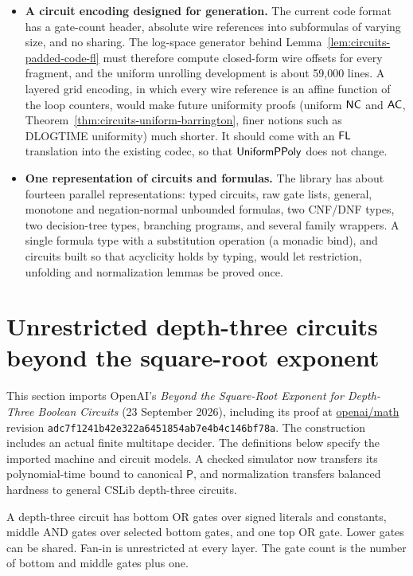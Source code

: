 \begin{itemize}
  \item \textbf{A circuit encoding designed for generation.} The current code
    format has a gate-count header, absolute wire references into subformulas
    of varying size, and no sharing. The log-space generator behind
    Lemma~\ref{lem:circuits-padded-code-fl} must therefore compute closed-form
    wire offsets for every fragment, and the uniform unrolling development is
    about 59,000 lines. A layered grid encoding, in which every wire reference
    is an affine function of the loop counters, would make future uniformity
    proofs (uniform $\mathsf{NC}$ and $\mathsf{AC}$, Theorem~\ref{thm:circuits-uniform-barrington},
    finer notions such as DLOGTIME uniformity) much shorter. It should come
    with an $\mathsf{FL}$ translation into the existing codec, so that
    $\mathsf{UniformPPoly}$ does not change.
  \item \textbf{One representation of circuits and formulas.} The library has
    about fourteen parallel representations: typed circuits, raw gate lists,
    general, monotone and negation-normal unbounded formulas, two CNF/DNF
    types, two decision-tree types, branching programs, and several family
    wrappers. A single formula type with a substitution operation (a monadic
    bind), and circuits built so that acyclicity holds by typing, would let
    restriction, unfolding and normalization lemmas be proved once.
\end{itemize}

\section{Unrestricted depth-three circuits beyond the square-root exponent}
\label{sec:circuits-unrestricted-depth-three}

This section imports OpenAI's \emph{Beyond the Square-Root Exponent for
Depth-Three Boolean Circuits} (23 September 2026), including its proof at
\href{https://github.com/openai/math/tree/adc7f1241b42e322a6451854ab7e4b4c146bf78a/lean/OAI/Computability/DepthThree}{openai/math}
revision \texttt{adc7f1241b42e322a6451854ab7e4b4c146bf78a}.
The construction includes an actual finite multitape decider. The definitions
below specify the imported machine and circuit models. A checked simulator
now transfers its polynomial-time bound to canonical $\mathsf P$, and
normalization transfers balanced hardness to general CSLib depth-three circuits.

\begin{definition}
  \label{def:circuits-openai-depth-three}
  \leanok
  A depth-three circuit has bottom OR gates over signed literals and constants,
  middle AND gates over selected bottom gates, and one top OR gate.
  Lower gates can be shared. Fan-in is unrestricted at every layer.
  The gate count is the number of bottom and middle gates plus one.
\end{definition}


